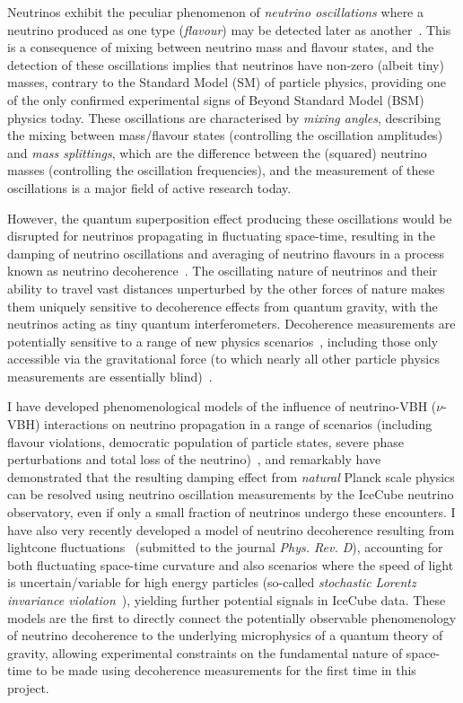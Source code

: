 \documentclass[a4paper,11pt]{article}
\begin{document}
Neutrinos exhibit the peculiar phenomenon of \textit{neutrino oscillations} where a neutrino produced as one type (\textit{flavour}) may be detected later as another~\cite{Fukuda:1998mi, Ahmad:2001an,Ahmad:2002jz}. This is a consequence of mixing between neutrino mass and flavour states, and the detection of these oscillations implies that neutrinos have non-zero (albeit tiny) masses, contrary to the Standard Model (SM) of particle physics, providing one of the only confirmed experimental signs of Beyond Standard Model (BSM) physics today. These oscillations are characterised by \textit{mixing angles}, describing the mixing between mass/flavour states (controlling the oscillation amplitudes) and \textit{mass splittings}, which are the difference between the (squared) neutrino masses (controlling the oscillation frequencies), and the measurement of these oscillations is a major field of active research today.

However, the quantum superposition effect producing these oscillations would be disrupted for neutrinos propagating in fluctuating space-time, resulting in the damping of neutrino oscillations and averaging of neutrino flavours in a process known as neutrino decoherence~\cite{Benatti_2000, PhysRevLett.85.1166}. The oscillating nature of neutrinos and their ability to travel vast distances unperturbed by the other forces of nature makes them uniquely sensitive to decoherence effects from quantum gravity, with the neutrinos acting as tiny quantum interferometers. Decoherence measurements are potentially sensitive to a range of new physics scenarios~\cite{Mavromatos2010, AmelinoCamelia:2008qg, Perlman_2015, Harlow:2018jwu, Hellmann:2021jyz, 1909.11271, EPJC802020, Capozzi:2018bps, 1904.02518}, including those only accessible via the gravitational force (to which nearly all other particle physics measurements are essentially blind)~\cite{Hellmann:2021jyz}.

I have developed phenomenological models of the influence of neutrino-VBH ($\nu$-VBH) interactions on neutrino propagation in a range of scenarios (including flavour violations, democratic population of particle states, severe phase perturbations and total loss of the neutrino)~\cite{PhysRevD.102.115003}, and remarkably have demonstrated that the resulting damping effect from \textit{natural} Planck scale physics can be resolved using neutrino oscillation measurements by the IceCube neutrino observatory, even if only a small fraction of neutrinos undergo these encounters. I have also very recently developed a model of neutrino decoherence resulting from lightcone fluctuations~\cite{2103.15313} (submitted to the journal \textit{Phys. Rev. D}), accounting for both fluctuating space-time curvature and also scenarios where the speed of light is uncertain/variable for high energy particles (so-called \textit{stochastic Lorentz invariance violation}~\cite{Vasileiou2015, Amelino-Camelia:2016fuh}), yielding further potential signals in IceCube data. These models are the first to directly connect the potentially observable phenomenology of neutrino decoherence to the underlying microphysics of a quantum theory of gravity, allowing experimental constraints on the fundamental nature of space-time to be made using decoherence measurements for the first time in this project.
\end{document}
